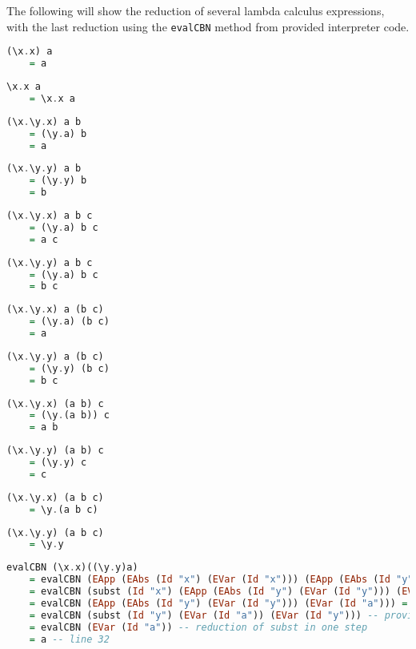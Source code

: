 \documentclass{article}
\theoremstyle{theorem}
\theoremstyle{definition}
\theoremstyle{remark}
\begin{document}
\noindent The following will show the reduction of several lambda calculus expressions, with the last reduction using the \texttt{evalCBN} method from provided interpreter code.
\begin{lstlisting}[language=Haskell]
(\x.x) a
    = a
\end{lstlisting}
\begin{lstlisting}[language=Haskell]
\x.x a
    = \x.x a
\end{lstlisting}
\begin{lstlisting}[language=Haskell]
(\x.\y.x) a b
    = (\y.a) b
    = a
\end{lstlisting}
\begin{lstlisting}[language=Haskell]
(\x.\y.y) a b
    = (\y.y) b
    = b
\end{lstlisting}
\newpage
\begin{lstlisting}[language=Haskell]
(\x.\y.x) a b c
    = (\y.a) b c
    = a c
\end{lstlisting}
\begin{lstlisting}[language=Haskell]
(\x.\y.y) a b c
    = (\y.a) b c
    = b c
\end{lstlisting}
\begin{lstlisting}[language=Haskell]
(\x.\y.x) a (b c)
    = (\y.a) (b c)
    = a
\end{lstlisting}
\begin{lstlisting}[language=Haskell]
(\x.\y.y) a (b c)
    = (\y.y) (b c)
    = b c
\end{lstlisting}
\begin{lstlisting}[language=Haskell]
(\x.\y.x) (a b) c
    = (\y.(a b)) c
    = a b
\end{lstlisting}
\begin{lstlisting}[language=Haskell]
(\x.\y.y) (a b) c
    = (\y.y) c
    = c
\end{lstlisting}
\begin{lstlisting}[language=Haskell]
(\x.\y.x) (a b c)
    = \y.(a b c)
\end{lstlisting}
\begin{lstlisting}[language=Haskell]
(\x.\y.y) (a b c)
    = \y.y
\end{lstlisting}
\begin{lstlisting}[language=Haskell]
evalCBN (\x.x)((\y.y)a)
    = evalCBN (EApp (EAbs (Id "x") (EVar (Id "x"))) (EApp (EAbs (Id "y") (EVar (Id "y"))) (EVar (Id "a")))) -- converted to concrete format
    = evalCBN (subst (Id "x") (EApp (EAbs (Id "y") (EVar (Id "y"))) (EVar (Id "a"))) (EVar (Id "x"))) -- provided interpreter line 27
    = evalCBN (EApp (EAbs (Id "y") (EVar (Id "y"))) (EVar (Id "a"))) = -- reduction of subst in one step
    = evalCBN (subst (Id "y") (EVar (Id "a")) (EVar (Id "y"))) -- provided interpreter line 27
    = evalCBN (EVar (Id "a")) -- reduction of subst in one step
    = a -- line 32
\end{lstlisting}
\newpage
\end{document}
